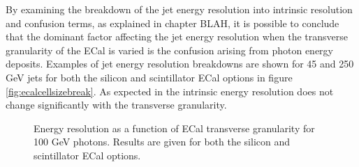 By examining the breakdown of the jet energy resolution into intrinsic resolution and confusion terms, as explained in chapter BLAH, it is possible to conclude that the dominant factor affecting the jet energy resolution when the transverse granularity of the ECal is varied is the confusion arising from photon energy deposits.  Examples of jet energy resolution breakdowns are shown for 45 and 250 GeV jets for both the silicon and scintillator ECal options in figure \ref{fig:ecalcellsizebreak}.  As expected in the intrinsic energy resolution does not change significantly with the transverse granularity.  

\begin{figure}
\centering
\caption[Energy resolution as a function of ECal transverse granularity for 100 GeV photons.  Results are given for both the silicon and scintillator ECal options.]{Energy resolution as a function of ECal transverse granularity for 100 GeV photons.  Results are given for both the silicon and scintillator ECal options.}
\label{fig:ecalcellsizegamma}
\end{figure}

